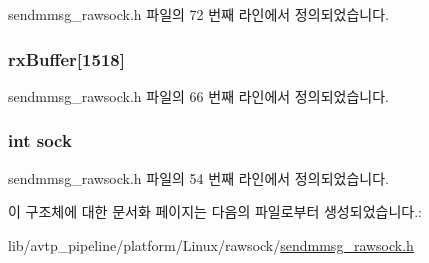 sendmmsg\+\_\+rawsock.\+h 파일의 72 번째 라인에서 정의되었습니다.

\subsubsection[{\texorpdfstring{rx\+Buffer}{rxBuffer}}]{ rx\+Buffer\mbox{[}1518\mbox{]}}\hypertarget{structsendmmsg__rawsock__t_a60a36f98faf9efc0f3447c6014c822ce}{}\label{structsendmmsg__rawsock__t_a60a36f98faf9efc0f3447c6014c822ce}


sendmmsg\+\_\+rawsock.\+h 파일의 66 번째 라인에서 정의되었습니다.

\subsubsection[{\texorpdfstring{sock}{sock}}]{\setlength{\rightskip}{0pt plus 5cm}int sock}\hypertarget{structsendmmsg__rawsock__t_a5903d0b282fc5eae503de618f896b5e1}{}\label{structsendmmsg__rawsock__t_a5903d0b282fc5eae503de618f896b5e1}


sendmmsg\+\_\+rawsock.\+h 파일의 54 번째 라인에서 정의되었습니다.



이 구조체에 대한 문서화 페이지는 다음의 파일로부터 생성되었습니다.\+:\begin{DoxyCompactItemize}
\item 
lib/avtp\+\_\+pipeline/platform/\+Linux/rawsock/\hyperlink{sendmmsg__rawsock_8h}{sendmmsg\+\_\+rawsock.\+h}\end{DoxyCompactItemize}
